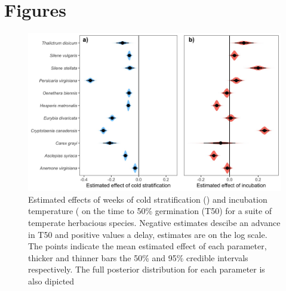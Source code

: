 \documentclass{article}\usepackage[]{graphicx}\usepackage[]{color}
\begin{document}
{%


\section*{Figures}
\begin{figure}[h!]
    \centering
\includegraphics[width=\textwidth]{..//figure/mus_survival.jpeg}
   \caption{Estimated effects of weeks of cold stratification () and incubation temperature ( on the time to 50\% germination (T50) for a suite of temperate herbacious species. Negative estimates descibe an advance in T50 and positive values a delay, estimates are on the log scale. The points indicate the mean estimated effect of each parameter, thicker  and thinner bars the 50\% and 95\% credible intervals respectively. The full posterior distribution for each parameter is also dipicted  } 
   \label{fig:musurv}
\end{figure}


}
\end{document}
